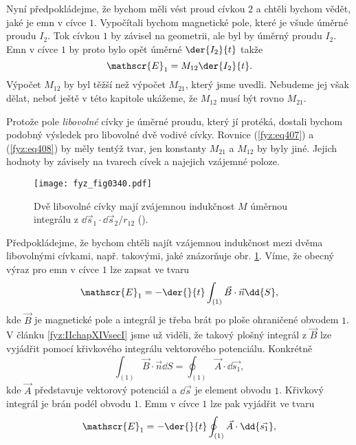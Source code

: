   Nyní předpokládejme, že bychom měli vést proud cívkou \(2\) a chtěli bychom vědět, jaké je emn v 
  cívce \(1\). Vypočítali bychom magnetické pole, které je všude úměrné proudu \(I_2\). Tok cívkou 
  \(1\) by závisel na geometrii, ale byl by úměrný proudu \(I_2\). Emn v cívce \(1\) by proto bylo 
  opět úměrné \(\der{I_2}{t}\) takže
  \begin{equation}\label{fyz:eq408}
    \mathscr{E}_1 = M_{12}\der{I_2}{t}.
  \end{equation}
  Výpočet \(M_{12}\) by byl těžší než výpočet \(M_{21}\), který jsme uvedli. Nebudeme jej však 
  dělat, neboť ještě v této kapitole ukážeme, že \(M_{12}\) musí být rovno \(M_{21}\).
  
  Protože pole \emph{libovolné} cívky je úměrné proudu, který jí protéká, dostali bychom podobný 
  výsledek pro libovolné dvě vodivé cívky. Rovnice (\ref{fyz:eq407}) a (\ref{fyz:eq408}) by měly 
  tentýž tvar, jen konstanty \(M_{21}\) a \(M_{12}\) by byly jiné. Jejich hodnoty by závisely na 
  tvarech cívek a najejich vzájemné poloze.
  
  \begin{figure}[ht!]  %
    \centering
    \texttt{[image: fyz\_fig0340.pdf]}
    \caption{Dvě libovolné cívky mají zvájemnou indukčnost \(M\) úměrnou integrálu z 
            \(\dd{\vec{s}_1}\cdot\dd{\vec{s}_2}/r_{12}\)
             (\cite[s.~305]{Feynman02}).}
    \label{fyz:fig0340}
  \end{figure}

  Předpokládejme, že bychom chtěli najít vzájemnou indukčnost mezi dvěma libovolnými cívkami, např. 
  takovými, jaké znázorňuje obr. \ref{fyz:fig0340}. Víme, že obecný výraz pro emn v 
  cívce \(1\) lze zapsat ve tvaru
  \begin{equation}\label{fyz:eq409}
    \mathscr{E}_1 = - \der{ }{t}\int_{(1)}\vec{B}\cdot\vec{n}\dd{S},
  \end{equation}
  kde \(\vec{B}\) je magnetické pole a integrál je třeba brát po ploše ohraničené obvodem \(1\). 
  V článku \ref{fyz:IIchapXIVsecI} jsme už viděli, že takový plošný integrál z \(\vec{B}\) lze 
  vyjádřit pomocí křivkového integrálu vektorového potenciálu. Konkrétně
  \begin{equation}\label{fyz:eq410}
    \int_{(1)}\vec{B}\cdot\vec{n}\dd{S} = \oint_{(1)}\vec{A}\cdot\dd{\vec{s_1}},
  \end{equation}
  kde \(\vec{A}\) představuje vektorový potenciál a \(\dd{\vec{s}}\) je element obvodu \(1\). 
  Křivkový integrál je brán podél obvodu \(1\). Emm v cívce \(1\) lze pak vyjádřit ve tvaru
  \begin{equation}\label{fyz:eq411}
    \mathscr{E}_1 = -\der{ }{t}\oint_{(1)}\vec{A}\cdot\dd{\vec{s_1}},
  \end{equation}
  
